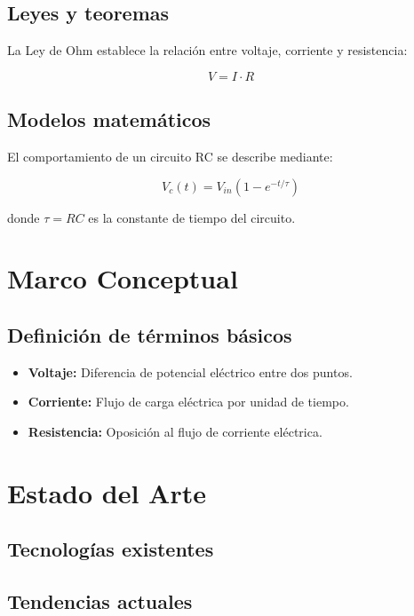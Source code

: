 \documentclass[12pt, letterpaper, oneside]{book}
\begin{document}
\subsection{Leyes y teoremas}
La Ley de Ohm establece la relación entre voltaje, corriente y resistencia:

\begin{equation}
    V = I \cdot R
    \label{eq:ohm}
\end{equation}

\subsection{Modelos matemáticos}
El comportamiento de un circuito RC se describe mediante:

\begin{equation}
    V_c(t) = V_{in} \left(1 - e^{-t/\tau}\right)
    \label{eq:rc_carga}
\end{equation}

donde $\tau = RC$ es la constante de tiempo del circuito.

\section{Marco Conceptual}
\subsection{Definición de términos básicos}
\begin{itemize}
    \item \textbf{Voltaje:} Diferencia de potencial eléctrico entre dos puntos.
    \item \textbf{Corriente:} Flujo de carga eléctrica por unidad de tiempo.
    \item \textbf{Resistencia:} Oposición al flujo de corriente eléctrica.
\end{itemize}

\section{Estado del Arte}
\subsection{Tecnologías existentes}
\subsection{Tendencias actuales}
\end{document}
